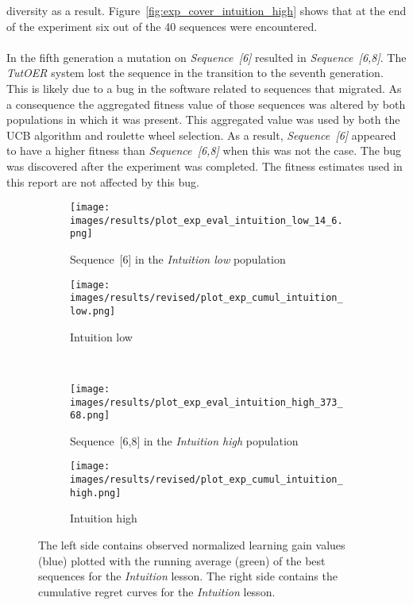 diversity as a result. Figure~\ref{fig:exp_cover_intuition_high} shows that at
the end of the experiment six out of the 40 sequences were encountered.\\\\
\noindent
In the fifth generation a mutation on \emph{Sequence~[6]} resulted in
\emph{Sequence~[6,8]}. The \emph{TutOER} system lost the sequence in the
transition to the seventh generation. This is likely due to a bug in the
software related to sequences that migrated. As a consequence the aggregated
fitness value of those sequences was altered by both populations in which it
was present. This aggregated value was used by both the UCB algorithm and
roulette wheel selection. As a result, \emph{Sequence~[6]} appeared to have a
higher fitness than \emph{Sequence~[6,8]} when this was not the case. The bug
was discovered after the experiment was completed. The fitness estimates used
in this report are not affected by this bug.

\begin{figure}[ht]
	\centering
	\begin{subfigure}{0.6\linewidth}
	\centering
	\texttt{[image: images/results/plot\_exp\_eval\_intuition\_low\_14\_6.png]}
	\caption{Sequence~[6] in the \emph{Intuition low} population}
	\label{fig:exp_eval_intuition_low_14}
	\end{subfigure}
	\hfill
	\begin{subfigure}{0.39\linewidth}
	\centering
	\texttt{[image: images/results/revised/plot\_exp\_cumul\_intuition\_low.png]}
	\caption{Intuition low}
	\label{fig:exp_cumul_intuition_low}
	\end{subfigure}\\
	\begin{subfigure}{0.6\linewidth}
	\centering
	\texttt{[image: images/results/plot\_exp\_eval\_intuition\_high\_373\_68.png]}
	\caption{Sequence~[6,8] in the \emph{Intuition high} population}
	\label{fig:exp_eval_intuition_high_373}
	\end{subfigure}
	\hfill
	\begin{subfigure}{0.39\linewidth}
	\centering
	\texttt{[image: images/results/revised/plot\_exp\_cumul\_intuition\_high.png]}
	\caption{Intuition high}
	\label{fig:exp_cumul_intuition_high}
	\end{subfigure}
	\caption[Evaluations of best sequences and cumulative regret in
	Intuition]{The left side contains observed normalized learning gain values
		(blue) plotted with the running average (green) of the best sequences
		for the \emph{Intuition} lesson. The right side contains the cumulative
		regret curves for the \emph{Intuition} lesson.}
	\label{fig:exp_eval_intuition}
\end{figure}

